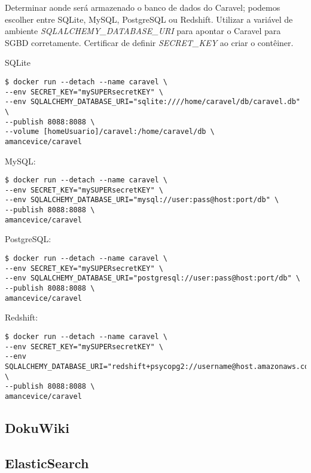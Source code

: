 \documentclass[a4paper,11pt]{article}
\begin{document}
Determinar aonde será armazenado o banco de dados do Caravel; podemos escolher entre SQLite, MySQL, PostgreSQL ou Redshift. Utilizar a variável de ambiente \textit{SQLALCHEMY\_DATABASE\_URI} para apontar o Caravel para SGBD corretamente. Certificar de definir \textit{SECRET\_KEY} ao criar o contêiner.

SQLite
\begin{lstlisting}[]
$ docker run --detach --name caravel \
--env SECRET_KEY="mySUPERsecretKEY" \
--env SQLALCHEMY_DATABASE_URI="sqlite:////home/caravel/db/caravel.db" \
--publish 8088:8088 \
--volume [homeUsuario]/caravel:/home/caravel/db \
amancevice/caravel
\end{lstlisting}

MySQL:
\begin{lstlisting}[]
$ docker run --detach --name caravel \
--env SECRET_KEY="mySUPERsecretKEY" \
--env SQLALCHEMY_DATABASE_URI="mysql://user:pass@host:port/db" \
--publish 8088:8088 \
amancevice/caravel
\end{lstlisting}

PostgreSQL:
\begin{lstlisting}[]
$ docker run --detach --name caravel \
--env SECRET_KEY="mySUPERsecretKEY" \
--env SQLALCHEMY_DATABASE_URI="postgresql://user:pass@host:port/db" \
--publish 8088:8088 \
amancevice/caravel
\end{lstlisting}

Redshift:
\begin{lstlisting}[]
$ docker run --detach --name caravel \
--env SECRET_KEY="mySUPERsecretKEY" \
--env SQLALCHEMY_DATABASE_URI="redshift+psycopg2://username@host.amazonaws.com:5439/db" \
--publish 8088:8088 \
amancevice/caravel
\end{lstlisting}

\subsection{DokuWiki}

\subsection{ElasticSearch}
\end{document}
